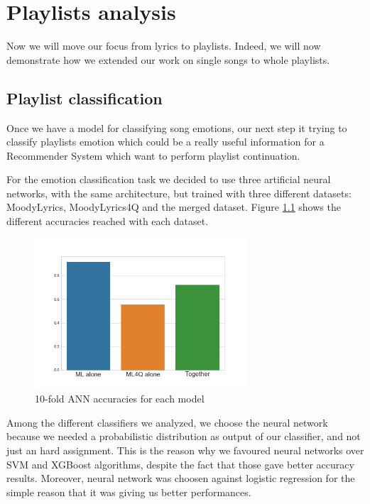 \chapter{Playlists analysis}

Now we will move our focus from lyrics to playlists. Indeed, we will now demonstrate how we extended our work on single songs to whole playlists.

\section{Playlist classification}

Once we have a model for classifying song emotions, our next step it trying to classify playlists emotion which could be a really useful information for a Recommender System which want to perform playlist continuation.

For the emotion classification task we decided to use three artificial neural networks, with the same architecture, but trained with three different datasets: MoodyLyrics, MoodyLyrics4Q and the merged dataset. Figure \ref{fig:annacc} shows the different accuracies reached with each dataset.

\begin{figure}[H]
\centering
\includegraphics[width=0.7\textwidth]{./chapters/chapter5/images/ANN_accuracies.png}
\caption{10-fold ANN accuracies for each model}
\label{fig:annacc}
\end{figure}

Among the different classifiers we analyzed, we choose the neural network because we needed a probabilistic distribution as output of our classifier, and not just an hard assignment. This is the reason why we favoured neural networks over SVM and XGBoost algorithms, despite the fact that those gave better accuracy results. Moreover, neural network was choosen against logistic regression for the simple reason that it was giving us better performances.

